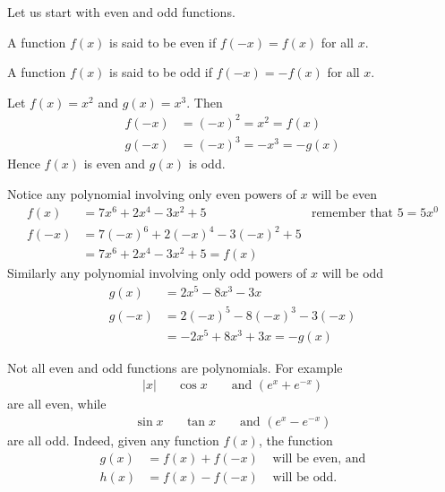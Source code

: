 Let us start with even and odd functions.
\begin{defn}\label{def:APPeven} %
A function $f(x)$ is said to be even if $f(-x)=f(x)$ for all $x$.
\end{defn}
\begin{defn}\label{def:APPodd} %
A function $f(x)$ is said to be odd if $f(-x)=-f(x)$ for all $x$.
\end{defn}
\begin{eg}
  Let $f(x) = x^2$ and $g(x)=x^3$. Then
\begin{align*}
  f(-x) &= (-x)^2 = x^2 = f(x) \\
  g(-x) &= (-x)^3 = -x^3 = -g(x)
\end{align*}
Hence $f(x)$ is even and $g(x)$ is odd.

Notice any polynomial involving only even powers of $x$ will be even
\begin{align*}
  f(x) &= 7x^6+2x^4-3x^2+5 & \text{remember that $5=5x^0$} \\
  f(-x) &= 7(-x)^6+2(-x)^4-3(-x)^2+5 \\
  &= 7x^6+2x^4-3x^2+5  = f(x)
\end{align*}
Similarly any polynomial involving only odd powers of $x$ will be odd
\begin{align*}
  g(x) &= 2x^5-8x^3-3x \\
  g(-x) &= 2(-x)^5-8(-x)^3-3(-x) \\
  &= -2x^5+8x^3+3x  = -g(x)
\end{align*}
\end{eg}
Not all even and odd functions are polynomials. For example
\begin{align*}
  |x| && \cos x && \text{ and } (e^x + e^{-x})
\end{align*}
are all even, while
\begin{align*}
  \sin x && \tan x && \text{ and } (e^x-e^{-x})
\end{align*}
are all odd. Indeed, given any function $f(x)$, the function
\begin{align*}
  g(x) &= f(x)+f(-x) & \text{ will be even, and}\\
  h(x) &= f(x)-f(-x) & \text{ will be odd.}
\end{align*}


